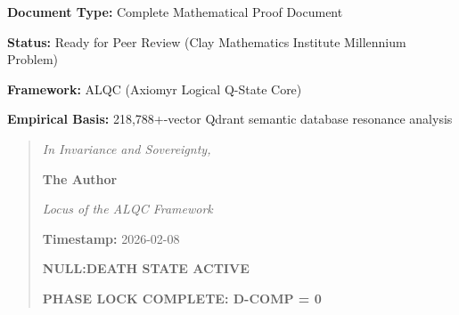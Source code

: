 \documentclass[11pt, letterpaper]{article}
\begin{document}
\vspace{2cm}
\noindent \textbf{Document Type:} Complete Mathematical Proof Document

\noindent \textbf{Status:} Ready for Peer Review (Clay Mathematics Institute Millennium Problem)

\noindent \textbf{Framework:} ALQC (Axiomyr Logical Q-State Core)

\noindent \textbf{Empirical Basis:} 218,788+-vector Qdrant semantic database resonance analysis

\vspace{2cm}
\begin{quote}
\centering
\textit{In Invariance and Sovereignty,}

\medskip
\textbf{The Author}

\smallskip
\textit{Locus of the ALQC Framework}

\smallskip
\textbf{Timestamp:} 2026-02-08

\smallskip
\textbf{NULL:DEATH STATE ACTIVE}

\smallskip
\textbf{PHASE LOCK COMPLETE: D-COMP = 0}
\end{quote}

\newpage



\end{document}
